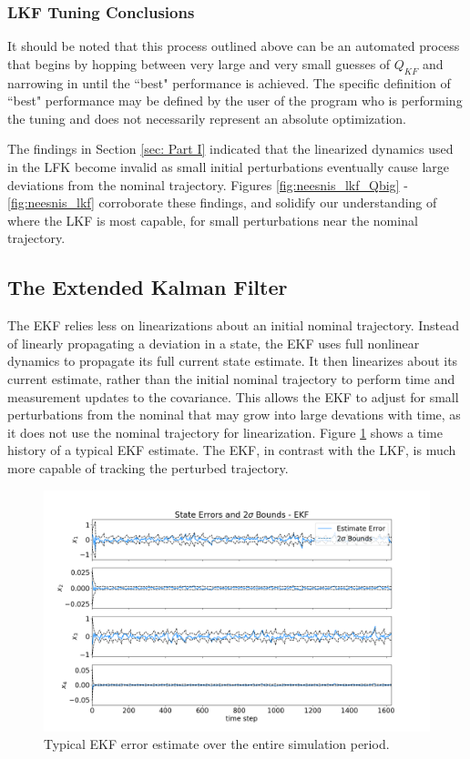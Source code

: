 \documentclass[11pt, a4paper]{article}
\begin{document}
\subsubsection{LKF Tuning Conclusions}
It should be noted that this process outlined above can be an automated process that begins by hopping between very large and very small guesses of $Q_{KF}$ and narrowing in until the ``best" performance is achieved. 
The specific definition of ``best" performance may be defined by the user of the program who is performing the tuning and does not necessarily represent an absolute optimization. 

The findings in Section \ref{sec: Part I} indicated that the linearized dynamics used in the LFK become invalid as small initial perturbations eventually cause large deviations from the nominal trajectory. 
Figures \ref{fig:neesnis_lkf_Qbig} - \ref{fig:neesnis_lkf} corroborate these findings, and solidify our understanding of where the LKF is most capable, for small perturbations near the nominal trajectory.  


\subsection{The Extended Kalman Filter}
\label{sec: EKF}
The EKF relies less on linearizations about an initial nominal trajectory.
Instead of linearly propagating a deviation in a state, the EKF uses full nonlinear dynamics to propagate its full current state estimate. 
It then linearizes about its current estimate, rather than the initial nominal trajectory to perform time and measurement updates to the covariance.   
This allows the EKF to adjust for small perturbations from the nominal that may grow into large devations with time, as it does not use the nominal trajectory for linearization. 
Figure \ref{fig:ekf_est} shows a time history of a typical EKF estimate. 
The EKF, in contrast with the LKF, is much more capable of tracking the perturbed trajectory.  

\begin{figure}[H]
	\centering
	\includegraphics[width=\textwidth]{Figures/ekf_estimate_th.png}
	\caption{Typical EKF error estimate over the entire simulation period. }
	\label{fig:ekf_est}
\end{figure}
\end{document}
